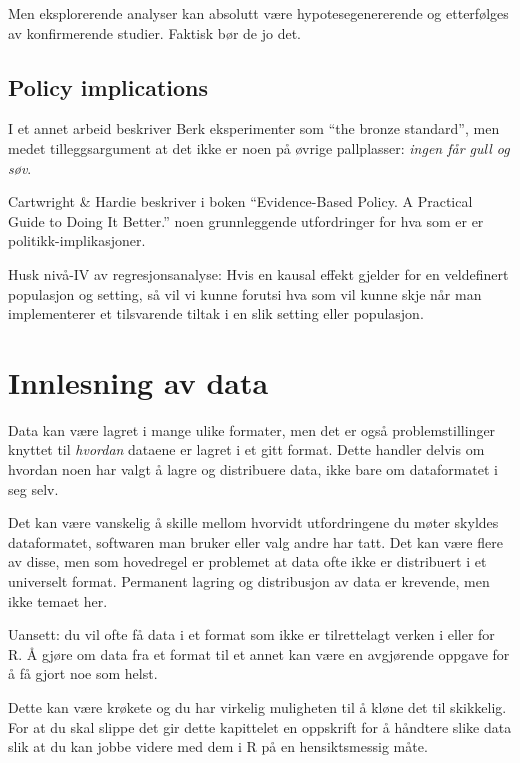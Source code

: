 \documentclass[
  letterpaper,
  DIV=11,
  numbers=noendperiod]{scrreprt}
\begin{document}
Men eksplorerende analyser kan absolutt være hypotesegenererende og
etterfølges av konfirmerende studier. Faktisk bør de jo det.

\hypertarget{policy-implications}{%
\section{Policy implications}\label{policy-implications}}

I et annet arbeid beskriver Berk eksperimenter som ``the bronze
standard'', men medet tilleggsargument at det ikke er noen på øvrige
pallplasser: \emph{ingen får gull og søv}.

Cartwright \& Hardie beskriver i boken ``Evidence-Based Policy. A
Practical Guide to Doing It Better.'' noen grunnleggende utfordringer
for hva som er er politikk-implikasjoner.

Husk nivå-IV av regresjonsanalyse: Hvis en kausal effekt gjelder for en
veldefinert populasjon og setting, så vil vi kunne forutsi hva som vil
kunne skje når man implementerer et tilsvarende tiltak i en slik setting
eller populasjon.


\hypertarget{innlesning-av-data}{%
\chapter{Innlesning av data}\label{innlesning-av-data}}

Data kan være lagret i mange ulike formater, men det er også
problemstillinger knyttet til \emph{hvordan} dataene er lagret i et gitt
format. Dette handler delvis om hvordan noen har valgt å lagre og
distribuere data, ikke bare om dataformatet i seg selv.

Det kan være vanskelig å skille mellom hvorvidt utfordringene du møter
skyldes dataformatet, softwaren man bruker eller valg andre har tatt.
Det kan være flere av disse, men som hovedregel er problemet at data
ofte ikke er distribuert i et universelt format. Permanent lagring og
distribusjon av data er krevende, men ikke temaet her.

Uansett: du vil ofte få data i et format som ikke er tilrettelagt verken
i eller for R. Å gjøre om data fra et format til et annet kan være en
avgjørende oppgave for å få gjort noe som helst.

Dette kan være krøkete og du har virkelig muligheten til å kløne det til
skikkelig. For at du skal slippe det gir dette kapittelet en oppskrift
for å håndtere slike data slik at du kan jobbe videre med dem i R på en
hensiktsmessig måte.
\end{document}
